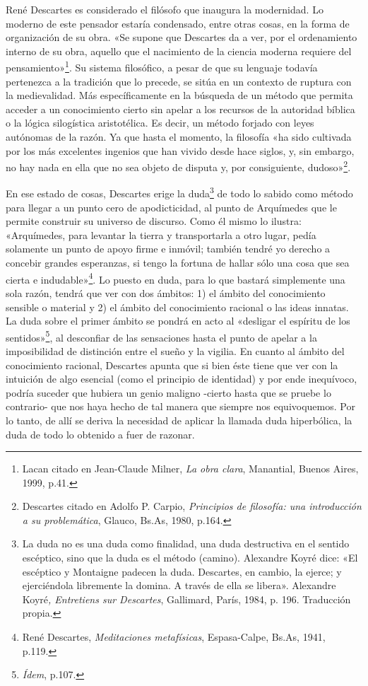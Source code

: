 René Descartes es considerado el filósofo que inaugura la modernidad. Lo moderno de este pensador estaría condensado, entre otras cosas, en la forma de organización de su obra. «Se supone que Descartes da a ver, por el ordenamiento interno de su obra, aquello que el nacimiento de la ciencia moderna requiere del pensamiento»\footnote{Lacan citado en Jean-Claude Milner, \emph{La obra clara}, Manantial, Buenos Aires, 1999, p.41.}. Su sistema filosófico, a pesar de que su lenguaje todavía pertenezca a la tradición que lo precede, se sitúa en un contexto de ruptura con la medievalidad. Más específicamente en la búsqueda de un método que permita acceder a un conocimiento cierto sin apelar a los recursos de la autoridad bíblica o la lógica silogística aristotélica. Es decir, un método forjado con leyes autónomas de la razón. Ya que hasta el momento, la filosofía «ha sido cultivada por los más excelentes ingenios que han vivido desde hace siglos, y, sin embargo, no hay nada en ella que no sea objeto de disputa y, por consiguiente, dudoso»\footnote{Descartes citado en Adolfo P. Carpio, \emph{Principios de filosofía: una introducción a su problemática}, Glauco, Bs.As, 1980, p.164.}.

En ese estado de cosas, Descartes erige la duda\footnote{La duda no es una duda como finalidad, una duda destructiva en el sentido escéptico, sino que la duda es el método (camino). Alexandre Koyré dice: «El escéptico y Montaigne padecen la duda. Descartes, en cambio, la ejerce; y ejerciéndola libremente la domina. A través de ella se libera». Alexandre Koyré\emph{, Entretiens sur Descartes}, Gallimard, París, 1984, p. 196. Traducción propia.} de todo lo sabido como método para llegar a un punto cero de apodicticidad, al punto de Arquímedes que le permite construir su universo de discurso. Como él mismo lo ilustra: «Arquímedes, para levantar la tierra y transportarla a otro lugar, pedía solamente un punto de apoyo firme e inmóvil; también tendré yo derecho a concebir grandes esperanzas, si tengo la fortuna de hallar sólo una cosa que sea cierta e indudable»\footnote{René Descartes, \emph{Meditaciones metafísicas}, Espasa-Calpe, Bs.As, 1941, p.119.}. Lo puesto en duda, para lo que bastará simplemente una sola razón, tendrá que ver con dos ámbitos: 1) el ámbito del conocimiento sensible o material y 2) el ámbito del conocimiento racional o las ideas innatas. La duda sobre el primer ámbito se pondrá en acto al «desligar el espíritu de los sentidos»\footnote{\emph{Ídem}, p.107.}, al desconfiar de las sensaciones hasta el punto de apelar a la imposibilidad de distinción entre el sueño y la vigilia. En cuanto al ámbito del conocimiento racional, Descartes apunta que si bien éste tiene que ver con la intuición de algo esencial (como el principio de identidad) y por ende inequívoco, podría suceder que hubiera un genio maligno -cierto hasta que se pruebe lo contrario- que nos haya hecho de tal manera que siempre nos equivoquemos. Por lo tanto, de allí se deriva la necesidad de aplicar la llamada duda hiperbólica, la duda de todo lo obtenido a fuer de razonar.

